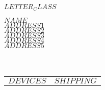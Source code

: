 \documentclass[12pt]{letter}
\begin{document}
\pagestyle{empty}
\noindent\textbf{$LETTER_CLASS$}

\noindent
$NAME$\\
$ADDRESS1$\\
$ADDRESS2$\\
$ADDRESS3$\\
$ADDRESS4$\\
$ADDRESS5$\\
\\\
\small{\begin{tabularx}{130px}{Xl}\texttt{$DEVICES$} & \texttt{$SHIPPING$}\end{tabularx}}
\end{document}
